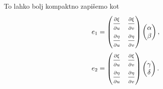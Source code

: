 To lahko bolj kompaktno zapišemo kot \begin{align*}
    e_1 &=  \begin{pmatrix}
    \frac{ \strut\partial \xi }{ \strut\partial u }  & \frac{ \strut\partial \xi }{ \strut\partial v }  \\
    \frac{ \strut\partial \eta }{ \strut\partial u }  & \frac{ \strut\partial \eta }{ \strut\partial v } 
    \end{pmatrix} \begin{pmatrix}
    \alpha \\ \beta 
    \end{pmatrix},     \\
    e_2 &= \begin{pmatrix}
      \frac{ \strut\partial \xi }{ \strut\partial u }  & \frac{ \strut\partial \xi }{ \strut\partial v }  \\
      \frac{ \strut\partial \eta }{ \strut\partial u }  & \frac{ \strut\partial \eta }{ \strut\partial v } 
      \end{pmatrix} \begin{pmatrix}
      \gamma \\ \delta 
      \end{pmatrix}.  
\end{align*}

